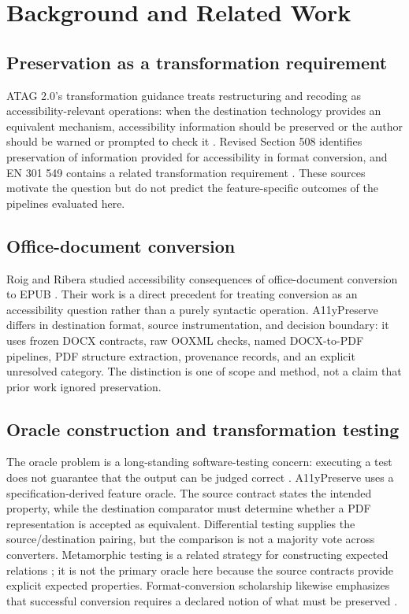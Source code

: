 \section{Background and Related Work}
\label{sec:background}

\subsection{Preservation as a transformation requirement}
ATAG 2.0's transformation guidance treats restructuring and recoding as accessibility-relevant operations: when the destination technology provides an equivalent mechanism, accessibility information should be preserved or the author should be warned or prompted to check it \cite{atag20}. Revised Section 508 identifies preservation of information provided for accessibility in format conversion, and EN 301 549 contains a related transformation requirement \cite{section508,etsi301549}. These sources motivate the question but do not predict the feature-specific outcomes of the pipelines evaluated here.

\subsection{Office-document conversion}
Roig and Ribera studied accessibility consequences of office-document conversion to EPUB \cite{roig2015}. Their work is a direct precedent for treating conversion as an accessibility question rather than a purely syntactic operation. A11yPreserve differs in destination format, source instrumentation, and decision boundary: it uses frozen DOCX contracts, raw OOXML checks, named DOCX-to-PDF pipelines, PDF structure extraction, provenance records, and an explicit unresolved category. The distinction is one of scope and method, not a claim that prior work ignored preservation.

\subsection{Oracle construction and transformation testing}
The oracle problem is a long-standing software-testing concern: executing a test does not guarantee that the output can be judged correct \cite{barr2015oracle}. A11yPreserve uses a specification-derived feature oracle. The source contract states the intended property, while the destination comparator must determine whether a PDF representation is accepted as equivalent. Differential testing supplies the source/destination pairing, but the comparison is not a majority vote across converters. Metamorphic testing is a related strategy for constructing expected relations \cite{segura2016metamorphic}; it is not the primary oracle here because the source contracts provide explicit expected properties. Format-conversion scholarship likewise emphasizes that successful conversion requires a declared notion of what must be preserved \cite{sperberg2011conversion}.

